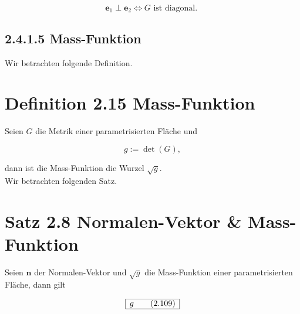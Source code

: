 \documentclass[10pt]{article}
\begin{document}
\begin{equation*}
\mathbf{e}_{1} \perp \mathbf{e}_{2} \Leftrightarrow G \text { ist diagonal. } \tag{2.107}
\end{equation*}


\subsection*{2.4.1.5 Mass-Funktion}
Wir betrachten folgende Definition.

\section*{Definition 2.15 Mass-Funktion}
Seien $G$ die Metrik einer parametrisierten Fläche und


\begin{equation*}
g:=\operatorname{det}(G), \tag{2.108}
\end{equation*}


dann ist die Mass-Funktion die Wurzel $\sqrt{g}$.\\
Wir betrachten folgenden Satz.

\section*{Satz 2.8 Normalen-Vektor \& Mass-Funktion}
Seien $\mathbf{n}$ der Normalen-Vektor und $\sqrt{g}$ die Mass-Funktion einer parametrisierten Fläche, dann gilt

\[
\begin{array}{|l|}
\hline g  \tag{2.109}\\
\hline
\end{array}
\]
\end{document}
